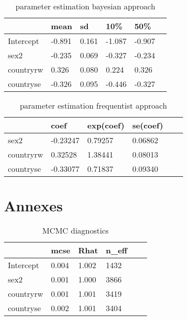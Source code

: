 \documentclass[
  twocolumn]{article}
\begin{document}
\begin{table}[h!]
\begin{center}
\begin{tabular}{|l|l|l|l|l|l|}
\hline
          & mean   & sd    & 10\%   & 50\%   \\ \hline
Intercept & -0.891 & 0.161 & -1.087 & -0.907 \\ \hline
sex2      & -0.235 & 0.069 & -0.327 & -0.234 \\ \hline
countryrw & 0.326  & 0.080 & 0.224  & 0.326  \\ \hline
countryse & -0.326  & 0.095 & -0.446  & -0.327  \\ \hline
\end{tabular}
\caption{parameter estimation bayesian approach}
\end{center}
\end{table}

\begin{table}[h!]
\begin{center}
\begin{tabular}{|l|l|l|l|l|l|}
\hline
          & coef     & exp(coef) & se(coef) \\ \hline
sex2      & -0.23247 & 0.79257   & 0.06862\\ \hline
countryrw & 0.32528  & 1.38441   & 0.08013 \\ \hline
countryse & -0.33077 & 0.71837   & 0.09340 \\ \hline
\end{tabular}
\caption{parameter estimation frequentist approach}
\end{center}
\end{table}

\hypertarget{annexes}{%
\section{Annexes}\label{annexes}}

\begin{table}[h!]
\begin{center}
\begin{tabular}{|l|l|l|l|l|l|}
\hline
          & mcse   & Rhat    & n\_eff \\ \hline
Intercept & 0.004  & 1.002   & 1432  \\ \hline
sex2      & 0.001  & 1.000   & 3866 \\ \hline
countryrw & 0.001  & 1.001   & 3419 \\ \hline
countryse & 0.002  & 1.001   & 3404 \\ \hline
\end{tabular}
\caption{MCMC diagnostics}
\end{center}
\end{table}
\end{document}
